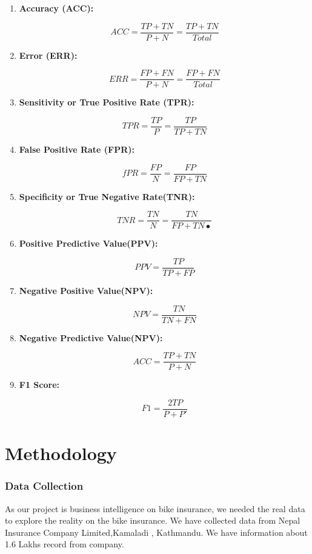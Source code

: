 \begin{enumerate}
\item \textbf{Accuracy (ACC):}
\par $$ACC = \frac{TP+TN}{P+N} =\frac{TP+TN}{Total}$$

\item \textbf{Error (ERR):}
\par $$ERR = \frac{FP+FN}{P+N} =\frac{FP+FN}{Total}$$


\item \textbf{Sensitivity or True Positive Rate (TPR):}
\par $$TPR = \frac{TP}{P}=\frac{TP}{TP+TN}$$

\item \textbf{False Positive Rate (FPR):}
\par $$fPR = \frac{FP}{N}=\frac{FP}{FP+TN}$$
\item \textbf{Specificity or True Negative Rate(TNR):}
\par $$TNR = \frac{TN}{N}=\frac{TN}{FP+TN•}$$

\item \textbf{Positive Predictive Value(PPV):}
\par $$PPV = \frac{TP}{TP+FP}$$
 
\item \textbf{Negative Positive Value(NPV):}
\par $$NPV = \frac{TN}{TN+FN}$$ 

\item \textbf{Negative Predictive Value(NPV):}
\par $$ACC = \frac{TP+TN}{P+N}$$

\item \textbf{F1 Score:}
\par $$F1=\frac{2TP}{P+P'} $$


\end{enumerate}




\chapter{Methodology}

\subsection{Data Collection}
As our project is business intelligence on bike insurance, we needed the real data to explore the reality on the bike insurance. We have collected data from Nepal Insurance Company Limited,Kamaladi , Kathmandu.\cite{data2017} We have information about 1.6 Lakhs record from company.
